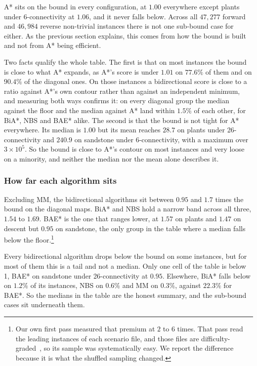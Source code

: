 \documentclass[letterpaper]{article} %
\begin{document}
A* sits on the bound in every configuration, at $1.00$ everywhere except plants under 6-connectivity at $1.06$, and it never falls below. Across all $47{,}277$ forward and $46{,}984$ reverse non-trivial instances there is not one sub-bound case for either. As the previous section explains, this comes from how the bound is built and not from A* being efficient.

Two facts qualify the whole table. The first is that on most instances the bound is close to what A* expands, as A*'s score is under $1.01$ on $77.6\%$ of them and on $90.4\%$ of the diagonal ones. On those instances a bidirectional score is close to a ratio against A*'s own contour rather than against an independent minimum, and measuring both ways confirms it: on every diagonal group the median against the floor and the median against A* land within $1.5\%$ of each other, for BiA*, NBS and BAE* alike. The second is that the bound is not tight for A* everywhere. Its median is $1.00$ but its mean reaches $28.7$ on plants under 26-connectivity and $240.9$ on sandstone under 6-connectivity, with a maximum over $3\times10^5$. So the bound is close to A*'s contour on most instances and very loose on a minority, and neither the median nor the mean alone describes it.

\subsubsection{How far each algorithm sits}
Excluding MM, the bidirectional algorithms sit between $0.95$ and $1.7$ times the bound on the diagonal maps. BiA* and NBS hold a narrow band across all three, $1.54$ to $1.69$. BAE* is the one that ranges lower, at $1.57$ on plants and $1.47$ on descent but $0.95$ on sandstone, the only group in the table where a median falls below the floor.\footnote{Our own first pass measured that premium at $2$ to $6$ times. That pass read the leading instances of each scenario file, and those files are difficulty-graded~\cite{nobes2023voxel}, so its sample was systematically easy. We report the difference because it is what the shuffled sampling changed.}

Every bidirectional algorithm drops below the bound on some instances, but for most of them this is a tail and not a median. Only one cell of the table is below 1, BAE* on sandstone under 26-connectivity at $0.95$. Elsewhere, BiA* falls below on $1.2\%$ of its instances, NBS on $0.6\%$ and MM on $0.3\%$, against $22.3\%$ for BAE*. So the medians in the table are the honest summary, and the sub-bound cases sit underneath them.
\end{document}
